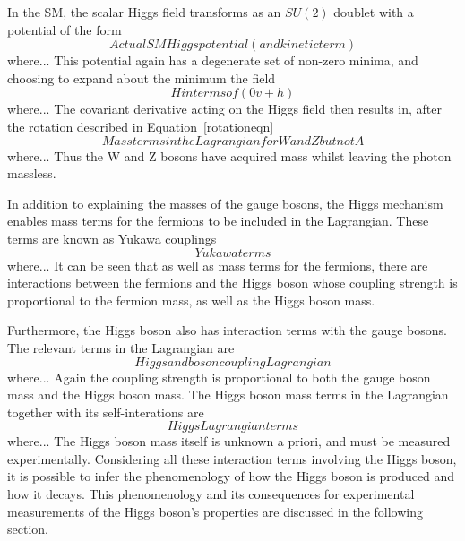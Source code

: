 In the SM, the scalar Higgs field transforms as an $SU(2)$ doublet with a potential of the form
\begin{equation}
Actual SM Higgs potential (and kinetic term)
\end{equation}
where... 
This potential again has a degenerate set of non-zero minima, 
and choosing to expand about the minimum the field 
\begin{equation}
H in terms of (0 v+h)
\end{equation}
where... 
The covariant derivative acting on the Higgs field then results in, 
after the rotation described in Equation~\ref{rotationeqn}
\begin{equation}
Mass terms in the Lagrangian for W and Z but not A
\end{equation}
where... 
Thus the W and Z bosons have acquired mass whilst leaving the photon massless.

In addition to explaining the masses of the gauge bosons, 
the Higgs mechanism enables mass terms for the fermions to be included in the Lagrangian.
These terms are known as Yukawa couplings~\cite{Griffiths,Peskin}
\begin{equation}
Yukawa terms
\end{equation}
where... 
It can be seen that as well as mass terms for the fermions, 
there are interactions between the fermions and the Higgs boson 
whose coupling strength is proportional to the fermion mass, as well as the Higgs boson mass.

Furthermore, the Higgs boson also has interaction terms with the gauge bosons.
The relevant terms in the Lagrangian are
\begin{equation}
Higgs and boson coupling Lagrangian
\end{equation}
where... 
Again the coupling strength is proportional to both the gauge boson mass and the Higgs boson mass.
The Higgs boson mass terms in the Lagrangian together with its self-interations are 
\begin{equation}
Higgs Lagrangian terms
\end{equation}
where... 
The Higgs boson mass itself is unknown a priori, and must be measured experimentally.
Considering all these interaction terms involving the Higgs boson, 
it is possible to infer the phenomenology of how the Higgs boson is produced and how it decays.
This phenomenology and its consequences for experimental measurements 
of the Higgs boson's properties are discussed in the following section.

